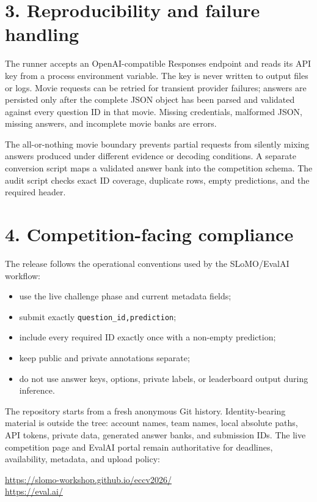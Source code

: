\documentclass[10pt]{article}
\begin{document}
\newpage

\section*{3. Reproducibility and failure handling}

The runner accepts an OpenAI-compatible Responses endpoint and reads its API
key from a process environment variable. The key is never written to output
files or logs. Movie requests can be retried for transient provider failures;
answers are persisted only after the complete JSON object has been parsed and
validated against every question ID in that movie. Missing credentials,
malformed JSON, missing answers, and incomplete movie banks are errors.

The all-or-nothing movie boundary prevents partial requests from silently
mixing answers produced under different evidence or decoding conditions. A
separate conversion script maps a validated answer bank into the competition
schema. The audit script checks exact ID coverage, duplicate rows, empty
predictions, and the required header.

\section*{4. Competition-facing compliance}

The release follows the operational conventions used by the SLoMO/EvalAI
workflow:
\begin{itemize}
  \item use the live challenge phase and current metadata fields;
  \item submit exactly \texttt{question\_id,prediction};
  \item include every required ID exactly once with a non-empty prediction;
  \item keep public and private annotations separate;
  \item do not use answer keys, options, private labels, or leaderboard output
        during inference.
\end{itemize}

The repository starts from a fresh anonymous Git history. Identity-bearing
material is outside the tree: account names, team names, local absolute paths,
API tokens, private data, generated answer banks, and submission IDs. The live
competition page and EvalAI portal remain authoritative for deadlines,
availability, metadata, and upload policy:
\begin{center}
\url{https://slomo-workshop.github.io/eccv2026/}\\
\url{https://eval.ai/}
\end{center}
\end{document}
